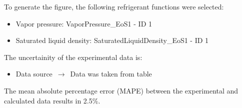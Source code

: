 To generate the figure, the following refrigerant functions were selected:
\begin{itemize}
\item Vapor pressure: VaporPressure\_EoS1 - ID 1
\item Saturated liquid density: SaturatedLiquidDensity\_EoS1 - ID 1
\end{itemize}

The uncertainity of the experimental data is:
\begin{itemize}
\item Data source $\,\to\,$ Data was taken from table
\end{itemize}

The mean absolute percentage error (MAPE) between the experimental and calculated data results in 2.5\%.
\FloatBarrier
\newpage
